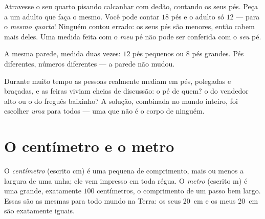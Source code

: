 \begin{example}\label{ex:g2:measuring-length:pace}
Atravesse o seu quarto pisando calcanhar com dedão, contando os seus
pés. Peça a um adulto que faça o mesmo. Você pode contar $18$ pés e o
adulto só $12$ --- para o \emph{mesmo quarto}! Ninguém contou errado:
os seus pés são menores, então cabem mais deles. Uma medida feita com
o \emph{meu} pé não pode ser conferida com o \emph{seu} pé.
\end{example}

\begin{omfigure}

{\small A mesma parede, medida duas vezes: $12$ pés pequenos ou $8$
pés grandes. Pés diferentes, números diferentes --- a parede não
mudou.}
\end{omfigure}

\begin{remark}\label{rem:g2:measuring-length:argument}
Durante muito tempo as pessoas realmente mediam em pés, polegadas e
braçadas, e as feiras viviam cheias de discussão: o pé de quem? o do
vendedor alto ou o do freguês baixinho? A solução, combinada no mundo
inteiro, foi escolher \emph{uma}  para todos --- uma 
que não é o corpo de ninguém.
\end{remark}

\section{O centímetro e o metro}

\begin{definition}\label{def:g2:measuring-length:units}
O \emph{centímetro} (escrito \unit{cm}) é uma
 pequena de comprimento, mais ou menos a largura de uma unha;
ele vem impresso em toda régua. O \emph{metro} (escrito
\unit{m}) é uma  grande, exatamente $100$ centímetros, o
comprimento de um passo bem largo. Essas  são as mesmas para
todo mundo na Terra: os seus \qty{20}{cm} e os meus \qty{20}{cm} são
exatamente iguais.
\end{definition}

